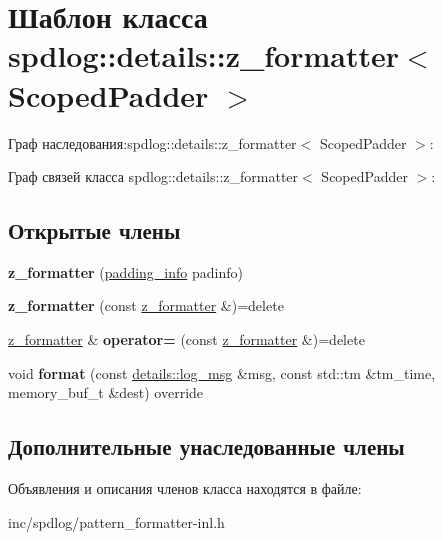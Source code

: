 \hypertarget{classspdlog_1_1details_1_1z__formatter}{}\section{Шаблон класса spdlog\+:\+:details\+:\+:z\+\_\+formatter$<$ Scoped\+Padder $>$}
\label{classspdlog_1_1details_1_1z__formatter}


Граф наследования\+:spdlog\+:\+:details\+:\+:z\+\_\+formatter$<$ Scoped\+Padder $>$\+:


Граф связей класса spdlog\+:\+:details\+:\+:z\+\_\+formatter$<$ Scoped\+Padder $>$\+:
\subsection*{Открытые члены}
\begin{DoxyCompactItemize}
\item 
\mbox{\label{classspdlog_1_1details_1_1z__formatter_a39c2df8f0bda373730e2540f18bba564}} 
{\bfseries z\+\_\+formatter} (\hyperlink{structspdlog_1_1details_1_1padding__info}{padding\+\_\+info} padinfo)
\item 
\mbox{\label{classspdlog_1_1details_1_1z__formatter_a9bbc0082721cc9bb7233aa9406fb93ab}} 
{\bfseries z\+\_\+formatter} (const \hyperlink{classspdlog_1_1details_1_1z__formatter}{z\+\_\+formatter} \&)=delete
\item 
\mbox{\label{classspdlog_1_1details_1_1z__formatter_acd4a55e8714ef085e9935a397e3dafe3}} 
\hyperlink{classspdlog_1_1details_1_1z__formatter}{z\+\_\+formatter} \& {\bfseries operator=} (const \hyperlink{classspdlog_1_1details_1_1z__formatter}{z\+\_\+formatter} \&)=delete
\item 
\mbox{\label{classspdlog_1_1details_1_1z__formatter_ab78901be4e998d0d48a04d1b0201bec8}} 
void {\bfseries format} (const \hyperlink{structspdlog_1_1details_1_1log__msg}{details\+::log\+\_\+msg} \&msg, const std\+::tm \&tm\+\_\+time, memory\+\_\+buf\+\_\+t \&dest) override
\end{DoxyCompactItemize}
\subsection*{Дополнительные унаследованные члены}


Объявления и описания членов класса находятся в файле\+:\begin{DoxyCompactItemize}
\item 
inc/spdlog/pattern\+\_\+formatter-\/inl.\+h\end{DoxyCompactItemize}
